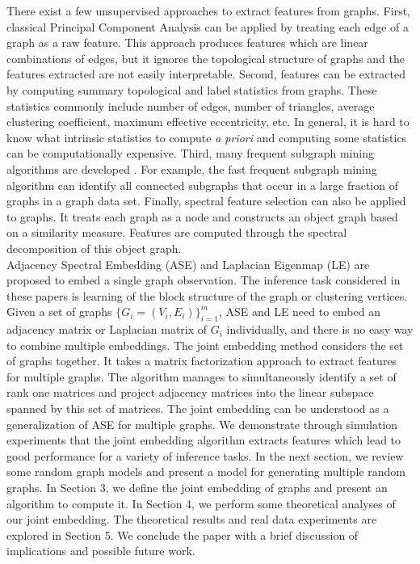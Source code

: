 \documentclass[10pt,journal,compsoc]{IEEEtran}
\begin{document}
\noindent There exist a few unsupervised approaches to extract features from graphs. First, classical Principal Component Analysis can be applied by treating each edge of a graph as a raw feature\cite{jolliffe2002principal}. This approach produces features which are linear combinations of edges, but it ignores the topological structure of graphs and the features extracted are not easily interpretable. Second, features can be extracted by computing summary topological and label statistics from graphs\cite{li2011graph,park2013anomaly}. These statistics commonly include number of edges, number of triangles, average clustering coefficient, maximum effective eccentricity, etc. In general, it is hard to know what intrinsic statistics to compute \textit{a priori} and computing some statistics can be computationally expensive. Third, many frequent subgraph mining algorithms are developed \cite{jiang2013survey}. For example, the fast frequent subgraph mining algorithm can identify all connected subgraphs that occur in a large fraction of graphs in a graph data set\cite{huan2003efficient}. Finally, spectral feature selection can also be applied to graphs. It treats each graph as a node and constructs an object graph based on a similarity measure. Features are computed through the spectral decomposition of this object graph\cite{zhao2007spectral}. \\
\newline
\noindent Adjacency Spectral Embedding (ASE) and Laplacian Eigenmap (LE) are proposed to embed a single graph observation\cite{sussman2012consistent, belkin2003laplacian}. The inference task considered in these papers is learning of the block structure of the graph or clustering vertices. Given a set of graphs $\{G_i=(V_i,E_i)\} _{i=1}^{m}$, ASE and LE need to embed an adjacency matrix or Laplacian matrix of $G_i$ individually, and there is no easy way to combine multiple embeddings. The joint embedding method considers the set of graphs together. It takes a matrix factorization approach to extract features for multiple graphs. The algorithm manages to simultaneously identify a set of rank one matrices and project adjacency matrices into the linear subspace spanned by this set of matrices. The joint embedding can be understood as a generalization of ASE for multiple graphs. We demonstrate through simulation experiments that the joint embedding algorithm extracts features which lead to good performance for a variety of inference tasks. In the next section, we review some random graph models and present a model for generating multiple random graphs. In Section 3, we define the joint embedding of graphs and present an algorithm to compute it. In Section 4, we perform some theoretical analyses of our joint embedding. The theoretical results and real data experiments are explored in Section 5. We conclude the paper with a brief discussion of implications and possible future work.
\end{document}
